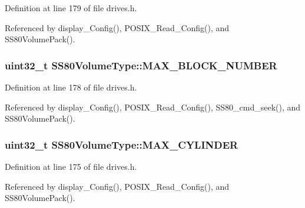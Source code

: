 Definition at line 179 of file drives.\+h.



Referenced by display\+\_\+\+Config(), P\+O\+S\+I\+X\+\_\+\+Read\+\_\+\+Config(), and S\+S80\+Volume\+Pack().

\subsubsection[{\texorpdfstring{M\+A\+X\+\_\+\+B\+L\+O\+C\+K\+\_\+\+N\+U\+M\+B\+ER}{MAX_BLOCK_NUMBER}}]{\setlength{\rightskip}{0pt plus 5cm}uint32\+\_\+t S\+S80\+Volume\+Type\+::\+M\+A\+X\+\_\+\+B\+L\+O\+C\+K\+\_\+\+N\+U\+M\+B\+ER}\hypertarget{structSS80VolumeType_afe3db69c9ec54fa6d9fd48f3e6e9097b}{}\label{structSS80VolumeType_afe3db69c9ec54fa6d9fd48f3e6e9097b}


Definition at line 178 of file drives.\+h.



Referenced by display\+\_\+\+Config(), P\+O\+S\+I\+X\+\_\+\+Read\+\_\+\+Config(), S\+S80\+\_\+cmd\+\_\+seek(), and S\+S80\+Volume\+Pack().

\subsubsection[{\texorpdfstring{M\+A\+X\+\_\+\+C\+Y\+L\+I\+N\+D\+ER}{MAX_CYLINDER}}]{\setlength{\rightskip}{0pt plus 5cm}uint32\+\_\+t S\+S80\+Volume\+Type\+::\+M\+A\+X\+\_\+\+C\+Y\+L\+I\+N\+D\+ER}\hypertarget{structSS80VolumeType_a53b65739246cea4e0d9095c88b03be8e}{}\label{structSS80VolumeType_a53b65739246cea4e0d9095c88b03be8e}


Definition at line 175 of file drives.\+h.



Referenced by display\+\_\+\+Config(), P\+O\+S\+I\+X\+\_\+\+Read\+\_\+\+Config(), and S\+S80\+Volume\+Pack().

